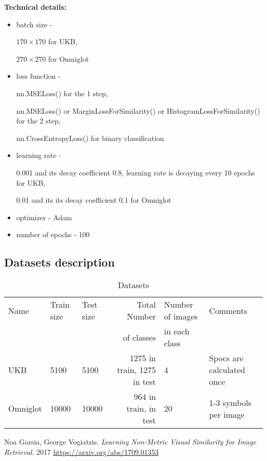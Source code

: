 \documentclass[10pt,a4paper]{article}
\begin{document}
    \textbf{Technical details:}
    \begin{itemize}
        \item{batch size -

        $170 \times 170$ for UKB,

        $270 \times 270$ for Omniglot}
        \item{loss function -

        nn.MSELoss() for the 1 step,

        nn.MSELoss() or MarginLossForSimilarity() or HistogramLossForSimilarity() for the 2 step,

        nn.CrossEntropyLoss() for binary classification}
        \item{learning rate -

        0.001 and its decay coefficient 0.8, learning rate is decaying every 10 epochs for UKB,

        0.01 and its its decay coefficient 0.1 for Omniglot}
        \item{optimizer - Adam}
        \item{number of epochs - 100}
    \end{itemize}

    \subsection{Datasets description}\label{subsec:datasetsDescription}

    \begin{table}[h!]
        \begin{tabular}{|l|l|l|r|l|l|}
            \hline
            Name & Train size & Test size & Total Number & Number of images & Comments                  \\
            & & & of classes & in each class &                           \\ \hline
            UKB & 5100 & 5100 & 1275 in train, 1275 in test & 4 & Spocs are calculated once \\ \hline
            Omniglot & 10000 & 10000 & 964 in train, \space659 in test & 20 & 1-3 symbols per image      \\ \hline
        \end{tabular}
        \caption{Datasets}
        \label{table:datasets_table}
    \end{table}


    \begin{thebibliography}{9}

        Noa Garsia, George Vogiatzis.
        \textit{Learning Non-Metric Visual Similarity for Image Retrieval}. 2017
        \url{https://arxiv.org/abs/1709.01353}

    \end{thebibliography}
\end{document}
